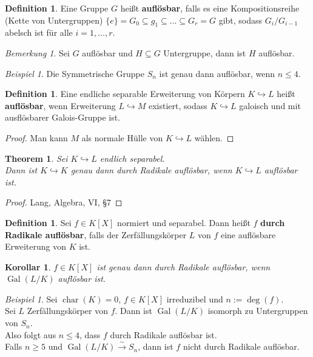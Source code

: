\documentclass[10pt,a4paper]{article}
\newcommand{\isomfunc}{\ensuremath{\xrightarrow{\sim}}}
\newcommand{\cha}{\ensuremath{\operatorname{char}}}
\newcommand{\Gal}{\ensuremath{\operatorname{Gal}}}
\newcounter{thm}[section]
\theoremstyle{definition}
\newtheorem{definition}[thm]{Definition}
\theoremstyle{plain}
\newtheorem{kor}[thm]{Korollar}
\newtheorem{theorem}[thm]{Theorem}
\theoremstyle{remark}
\newtheorem{bem}[thm]{Bemerkung}
\newtheorem{exm}[thm]{Beispiel}
\begin{document}
\begin{definition}
	Eine Gruppe $G$ heißt \textbf{auflösbar}, falls es eine Kompositionsreihe (Kette von Untergruppen) $\{e\}=G_0\subseteq g_1\subseteq...\subseteq G_r=G$ gibt, sodass $G_i/G_{i-1}$ abelsch ist für alle $i=1,...,r$.
\end{definition}

\begin{bem}
	Sei $G$ auflösbar und $H\subseteq G$ Untergruppe, dann ist $H$ auflösbar.
\end{bem}

\begin{exm}
	Die Symmetrische Gruppe $S_n$ ist genau dann auflösbar, wenn $n\leq 4$.
\end{exm}

\begin{definition}
	Eine endliche separable Erweiterung von Körpern $K\hookrightarrow L$ heißt \textbf{auflösbar}, wenn Erweiterung $L\hookrightarrow M$ existiert, sodass $K\hookrightarrow L$ galoisch und mit ausflösbarer Galois-Gruppe ist.
\end{definition}
\begin{proof}
	Man kann $M$ als normale Hülle von $K\hookrightarrow L$ wählen.
\end{proof}

\begin{theorem}\label{1121thm}
	Sei $K\hookrightarrow L$ endlich separabel.\\
	Dann ist $K\hookrightarrow K$ genau dann durch Radikale auflösbar, wenn $K\hookrightarrow L$ auflösbar ist.
\end{theorem}
\begin{proof}
	Lang, Algebra, VI, §7
\end{proof}

\begin{definition}
	Sei $f\in K[X]$ normiert und separabel. Dann heißt $f$ \textbf{durch Radikale auflösbar}, falls der Zerfällungskörper $L$ von $f$ eine auflösbare Erweiterung von $K$ ist.
\end{definition}

\addtocounter{thm}{-1}
\begin{kor}\label{1122kor}
	$f\in K[X]$ ist genau dann durch Radikale auflösbar, wenn $\Gal(L/K)$ auflösbar ist.
\end{kor}

\begin{exm}
	Sei $\cha(K)=0$, $f\in K[X]$ irreduzibel und $n:=\deg(f)$.\\
	Sei $L$ Zerfällungskörper von $f$. Dann ist $\Gal(L/K)$ isomorph zu Untergruppen von $S_n$.\\
	Also folgt aus $n\leq 4$, dass $f$ durch Radikale auflösbar ist.\\
	Falls $n\geq 5$ und $\Gal(L/K)\isomfunc S_n$, dann ist $f$ nicht durch Radikale auflösbar.
\end{exm}
\end{document}
